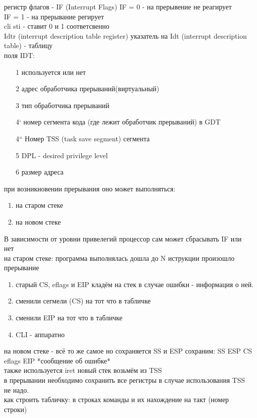 \documentclass[a4paper,10pt]{article}
\begin{document}
регистр флагов - IF (Interrupt Flags)
IF = 0 - на прерывение не реагирует \\
IF = 1 - на прерывание регирует \\
cli sti - ставит 0 и 1 соответсвенно\\
Idtr (interrupt description table register) указатель на Idt (interrupt description table) - таблицу\\
поля IDT:
\begin{enumerate}
    \item[1] используется или нет
    \item[2] адрес обработчика прерываний(виртуальный)
    \item[3] тип обработчика прерываний
    \item[4`] номер сегмента кода (где лежит обработчик прерываний) в GDT
    \item[4``] Номер TSS (task save segment) сегмента
    \item[5] DPL - desired privilege level
    \item[6] размер адреса 
\end{enumerate}
при возникновении прерывания оно может выполняться:
\begin{enumerate}
    \item на старом стеке
    \item на новом стеке
\end{enumerate}
В зависимости от уровни привелегий процессор сам может сбрасывать IF или нет \\
на старом стеке: программа выполнялась дошла до N иструкции произошло прерывание \\
\begin{enumerate}
\item старый CS, eflags и EIP кладём на стек в случае ошибки - информация о ней.
\item сменили сегмели (CS) на тот что в табличке
\item сменили EIP на тот что в табличке
\item CLI - аппаратно
\end{enumerate}
на новом стеке - всё то же самое но сохраняется SS и ESP сохраним: SS ESP CS eflags EIP *сообщение об ошибке* \\
также используется iret новый стек возьмём из TSS \\
в прерывании необходимо сохранить все регистры в случае использования TSS не надо. \\

\newpage
как строить табличку:
в строках команды и их нахождение на такт (номер строки)
\end{document}
